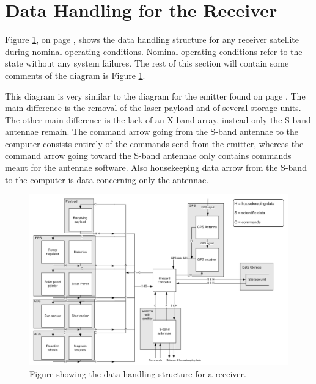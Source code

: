 \section{Data Handling for the Receiver}
\label{DataHandlingReceiver}

Figure \ref{fig:DHR}, on page \pageref{fig:DHR}, shows the data handling structure for any receiver satellite during nominal operating conditions. Nominal operating conditions refer to the state without any system failures. The rest of this section will contain some comments of the diagram is Figure \ref{fig:DHR}.

This diagram is very similar to the diagram for the emitter found on page \pageref{fig:DHE}. The main difference is the removal of the laser payload and of several storage units. The other main difference is the lack of an X-band array, instead only the S-band antennae remain. The command arrow going from the S-band antennae to the computer consists entirely of the commands send from the emitter, whereas the command arrow going toward the S-band antennae only contains commands meant for the antennae software. Also housekeeping data arrow from the S-band to the computer is data concerning only the antennae.

\begin{figure}
\centering
\includegraphics[width=1.0\textwidth, angle=90]{img/DHReceiver.png}
\caption{Figure showing the data handling structure for a receiver.}
\label{fig:DHR}
\end{figure}